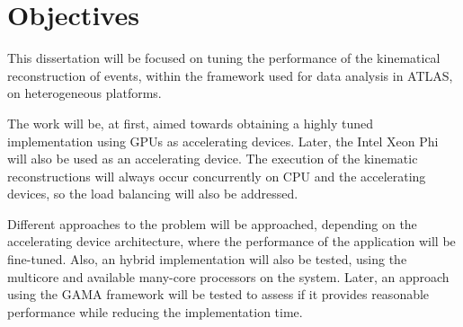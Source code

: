 \section{Objectives}

This dissertation will be focused on tuning the performance of the kinematical reconstruction of events, within the framework used for data analysis in ATLAS, on heterogeneous platforms.

The work will be, at first, aimed towards obtaining a highly tuned implementation using GPUs as accelerating devices. Later, the Intel Xeon Phi will also be used as an accelerating device. The execution of the kinematic reconstructions will always occur concurrently on CPU and the accelerating devices, so the load balancing will also be addressed.

Different approaches to the problem will be approached, depending on the accelerating device architecture, where the performance of the application will be fine-tuned. Also, an hybrid implementation will also be tested, using the multicore and available many-core processors on the system. Later, an approach using the GAMA framework will be tested to assess if it provides reasonable performance while reducing the implementation time.
